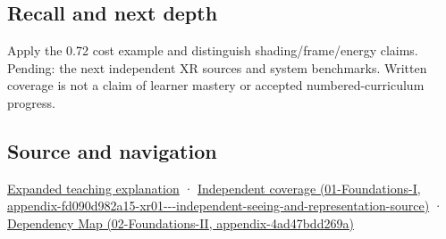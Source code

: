 \subsection{Recall and next depth}\label{appendix-5878b813b732-recall-and-next-depth}

Apply the 0.72 cost example and distinguish shading/frame/energy claims. Pending: the next independent XR sources and system benchmarks. Written coverage is not a claim of learner mastery or accepted numbered-curriculum progress.

\subsection{Source and navigation}\label{appendix-5878b813b732-source-and-navigation}

\hyperref[04-visual-computing-ii-ch042-foveation-is-allocation-under-uncertain-perception-and-timing]{Expanded teaching explanation} · \href{../01-Foundations-I/main.pdf\#nameddest=appendix-fd090d982a15-xr01---independent-seeing-and-representation-source}{Independent coverage (01-Foundations-I, appendix-fd090d982a15-xr01-\/-\/-independent-seeing-and-representation-source)} · \href{../02-Foundations-II/main.pdf\#nameddest=appendix-4ad47bdd269a}{Dependency Map (02-Foundations-II, appendix-4ad47bdd269a)}
